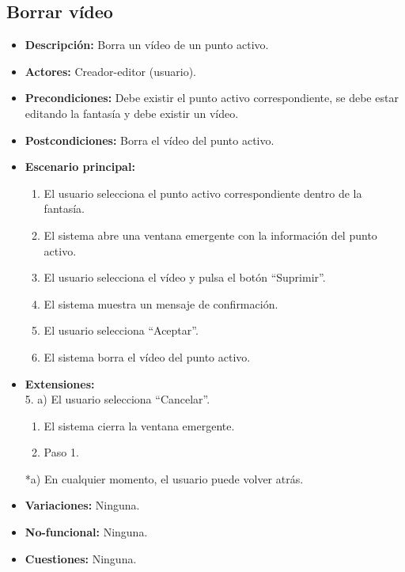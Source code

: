 \subsection{Borrar vídeo}
\begin{itemize}
	\item \textbf{Descripción:} Borra un vídeo de un punto activo.
	\item \textbf{Actores:} Creador-editor (usuario).
	\item \textbf{Precondiciones:} Debe existir el punto activo correspondiente, se debe estar editando la fantasía y debe existir un vídeo.
	\item \textbf{Postcondiciones:} Borra el vídeo del punto activo.
	\item \textbf{Escenario principal:}
	\begin{enumerate}
		\item El usuario selecciona el punto activo correspondiente dentro de la fantasía.
		\item El sistema abre una ventana emergente con la información del punto activo.
		\item El usuario selecciona el vídeo y pulsa el botón ``Suprimir''.
		\item El sistema muestra un mensaje de confirmación.
		\item El usuario selecciona ``Aceptar''.
		\item El sistema borra el vídeo del punto activo.
	\end{enumerate}
	\item \textbf{Extensiones:} \\ 5. a) El usuario selecciona ``Cancelar''.
	\begin{enumerate}
		\item El sistema cierra la ventana emergente.
		\item Paso 1.
	\end{enumerate}
	*a) En cualquier momento, el usuario puede volver atrás.
	\item \textbf{Variaciones:} Ninguna.
	\item \textbf{No-funcional:} Ninguna.
	\item \textbf{Cuestiones:} Ninguna.
\end{itemize}

